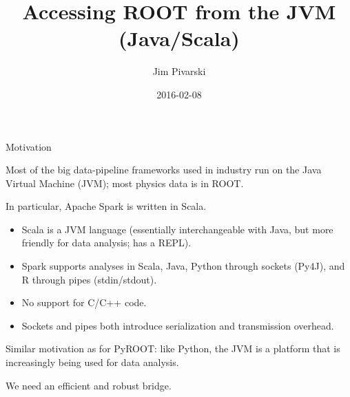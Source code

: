 \documentclass{beamer}
\title[2016-02-08-ROOT-JVM-firsttalk]{Accessing ROOT from the JVM (Java/Scala)}
\author{Jim Pivarski}
\date{2016-02-08}
\begin{document}
\begin{frame}
  \titlepage
\end{frame}


\begin{frame}{Motivation}
\begin{block}{}
\vspace{-\baselineskip}
Most of the big data-pipeline frameworks used in industry run on the Java Virtual Machine (JVM); most physics data is in ROOT.
\end{block}

\begin{block}{}
\vspace{-\baselineskip}
In particular, Apache Spark is written in Scala.
\begin{itemize}
\item Scala is a JVM language (essentially interchangeable with Java, but more friendly for data analysis; has a REPL).
\item Spark supports analyses in Scala, Java, Python through sockets (Py4J), and R through pipes (stdin/stdout).
\item No support for C/C++ code.
\item Sockets and pipes both introduce serialization and transmission overhead.
\end{itemize}
\end{block}

\begin{block}{}
\vspace{-\baselineskip}
Similar motivation as for PyROOT: like Python, the JVM is a platform that is increasingly being used for data analysis.

\vspace{0.5\baselineskip}
We need an efficient and robust bridge.
\end{block}
\end{frame}
\end{document}
